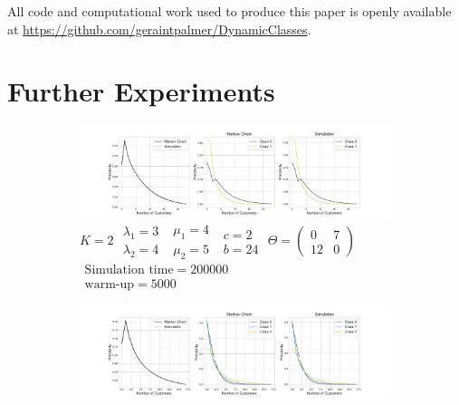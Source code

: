 \documentclass{article}
\begin{document}
All code and computational work used to produce this paper is openly available
at \url{https://github.com/geraintpalmer/DynamicClasses}.




\newpage
\appendix

\section{Further Experiments}\label{apx:more_priority_classes}

\begin{figure}[h!]
  \begin{center}
  \begin{subfigure}[b]{\textwidth}
    \includegraphics[width=\textwidth]{img/appendix_2class.pdf}
    \caption{
        $K = 2$
        $\begin{array}{c}\lambda_1 = 3\\\lambda_2 = 4\end{array}$
        $\begin{array}{c}\mu_1 = 4\\\mu_2 = 5\end{array}$
        $\begin{array}{c}c=2\\b=24\end{array}$
        $\Theta = \begin{pmatrix}0 & 7\\12 & 0\end{pmatrix}$
        $\begin{array}{c}\text{Simulation time} = 200000\\\text{warm-up} = 5000\end{array}$
    }
  \end{subfigure}
  \vspace{3mm}
  \begin{subfigure}[b]{\textwidth}
    \includegraphics[width=\textwidth]{img/appendix_3class.pdf}

\end{subfigure}
\end{center}
\end{figure}
\end{document}
